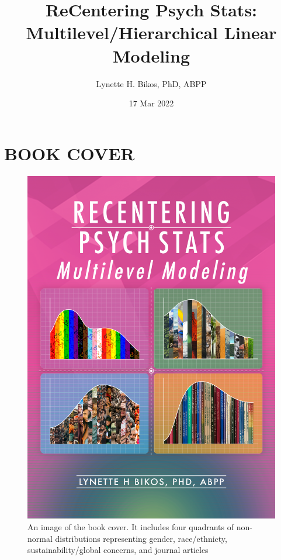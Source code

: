 \documentclass[
  11pt,
]{book}
\title{ReCentering Psych Stats: Multilevel/Hierarchical Linear Modeling}
\author{Lynette H. Bikos, PhD, ABPP}
\date{17 Mar 2022}
\begin{document}
\maketitle

{
\hypersetup{linkcolor=}
\setcounter{tocdepth}{1}
\tableofcontents
}
\hypertarget{book-cover}{%
\chapter*{BOOK COVER}\label{book-cover}}

\begin{figure}
\centering
\includegraphics{images/ReC_mlevel_bkcvr.png}
\caption{An image of the book cover. It includes four quadrants of non-normal distributions representing gender, race/ethnicty, sustainability/global concerns, and journal articles}
\end{figure}
\end{document}
